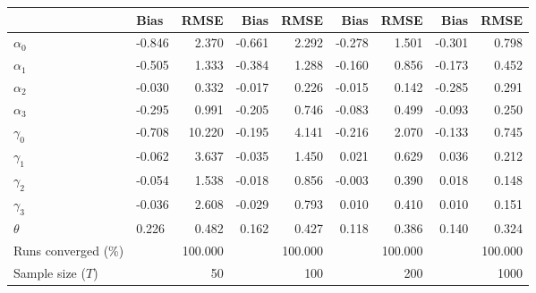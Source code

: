 
\begin{tabular}[t]{llrrrrrrr}
\toprule
  & Bias & RMSE & Bias & RMSE & Bias & RMSE & Bias & RMSE\\
\midrule
$\alpha_{0}$ & -0.846 & 2.370 & -0.661 & 2.292 & -0.278 & 1.501 & -0.301 & 0.798\\
$\alpha_{1}$ & -0.505 & 1.333 & -0.384 & 1.288 & -0.160 & 0.856 & -0.173 & 0.452\\
$\alpha_{2}$ & -0.030 & 0.332 & -0.017 & 0.226 & -0.015 & 0.142 & -0.285 & 0.291\\
$\alpha_{3}$ & -0.295 & 0.991 & -0.205 & 0.746 & -0.083 & 0.499 & -0.093 & 0.250\\
$\gamma_{0}$ & -0.708 & 10.220 & -0.195 & 4.141 & -0.216 & 2.070 & -0.133 & 0.745\\
$\gamma_{1}$ & -0.062 & 3.637 & -0.035 & 1.450 & 0.021 & 0.629 & 0.036 & 0.212\\
$\gamma_{2}$ & -0.054 & 1.538 & -0.018 & 0.856 & -0.003 & 0.390 & 0.018 & 0.148\\
$\gamma_{3}$ & -0.036 & 2.608 & -0.029 & 0.793 & 0.010 & 0.410 & 0.010 & 0.151\\
$\theta$ & 0.226 & 0.482 & 0.162 & 0.427 & 0.118 & 0.386 & 0.140 & 0.324\\
Runs converged (\%) &  & 100.000 &  & 100.000 &  & 100.000 &  & 100.000\\
Sample size ($T$) &  & 50 &  & 100 &  & 200 &  & 1000\\
\bottomrule
\end{tabular}
